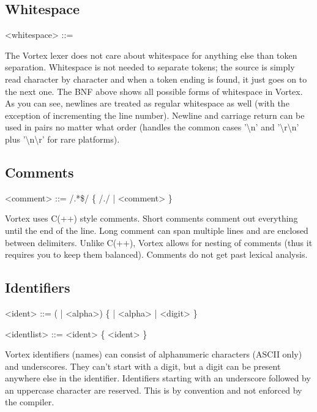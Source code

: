\documentclass{article}
\newenvironment{bnf}
{
\begin{mdframed}
\begin{grammar}
}
{
\end{grammar}
\end{mdframed}
}
\begin{document}
\subsection{Whitespace}
\begin{bnf}
<whitespace> ::= \lit{ }
    \alt \lit{\\n}
    \alt \lit{\\r}
    \alt \lit{\\t}
    \alt \lit{\\f}
    \alt \lit{\\v}
\end{bnf}
The Vortex lexer does not care about whitespace for anything else than token
separation. Whitespace is not needed to separate tokens; the source is simply
read character by character and when a token ending is found, it just goes on
to the next one. The BNF above shows all possible forms of whitespace in
Vortex. As you can see, newlines are treated as regular whitespace as well
(with the exception of incrementing the line number). Newline and carriage
return can be used in pairs no matter what order (handles the common cases
'\textbackslash n' and '\textbackslash r\textbackslash n' plus
'\textbackslash n\textbackslash r' for rare platforms).
\subsection{Comments}
\begin{bnf}
<comment> ::= \lit{//} /.*\$/
    \alt \lit{/*} \{ /./ | <comment> \} \lit{*/}
\end{bnf}
Vortex uses C(++) style comments. Short comments comment out everything until
the end of the line. Long comment can span multiple lines and are enclosed
between delimiters. Unlike C(++), Vortex allows for nesting of comments
(thus it requires you to keep them balanced). Comments do not get past
lexical analysis.
\subsection{Identifiers}
\begin{bnf}
<ident> ::= (\lit{_} | <alpha>) \{ \lit{_} | <alpha> | <digit> \}

<identlist> ::= <ident> \{ \lit{,} <ident> \}
\end{bnf}
Vortex identifiers (names) can consist of alphanumeric characters (ASCII only)
and underscores. They can't start with a digit, but a digit can be present
anywhere else in the identifier. Identifiers starting with an underscore
followed by an uppercase character are reserved. This is by convention and
not enforced by the compiler.
\end{document}

